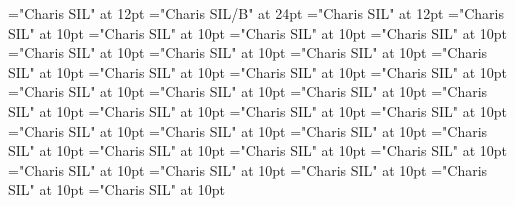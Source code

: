 \documentclass[a4paper]{article}
\begin{document}
\pagestyle{plain}
\sloppy
\setlength{\parfillskip}{0pt plus 1fil}
\font{}="Charis SIL" at 12pt
\font{}="Charis SIL/B" at 24pt
\font{}="Charis SIL" at 12pt
\font\entryletDatadicBody="Charis SIL" at 10pt
\font\pictureRightentryletDatadicBody="Charis SIL" at 10pt
\font\picturepictureRightentryletDatadicBody="Charis SIL" at 10pt
\font\pictureCaptionpictureRightentryletDatadicBody="Charis SIL" at 10pt
\font\CmPicturepublishStemPileThumbnailPubpictureCaptionpictureRightentryletDatadicBody="Charis SIL" at 10pt
\font\pictureLabelenpictureCaptionpictureRightentryletDatadicBody="Charis SIL" at 10pt
\font\spanenpictureLabelenpictureCaptionpictureRightentryletDatadicBody="Charis SIL" at 10pt
\font\headwordggoTeluxINentryletDatadicBody="Charis SIL" at 10pt
\font\pronunciationsentryletDatadicBody="Charis SIL" at 10pt
\font\pronunciationggofonipaxemicpronunciationsentryletDatadicBody="Charis SIL" at 10pt
\font\spanggofonipaxemicpronunciationggofonipaxemicpronunciationsentryletDatadicBody="Charis SIL" at 10pt
\font\sensesentryletDatadicBody="Charis SIL" at 10pt
\font\sensesensesentryletDatadicBody="Charis SIL" at 10pt
\font\grammaticalinfosensesensesentryletDatadicBody="Charis SIL" at 10pt
\font\partofspeechengrammaticalinfosensesensesentryletDatadicBody="Charis SIL" at 10pt
\font\spanenpartofspeechengrammaticalinfosensesensesentryletDatadicBody="Charis SIL" at 10pt
\font\xsensenumbersensesentryletDatadicBody="Charis SIL" at 10pt
\font{}="Charis SIL" at 10pt
\font\spanendefinitionensensesensesentryletDatadicBody="Charis SIL" at 10pt
\font\LexSensepublishStemGlossPubensensesensesentryletDatadicBody="Charis SIL" at 10pt
\font\spanenLexSensepublishStemGlossPubensensesensesentryletDatadicBody="Charis SIL" at 10pt
\font\examplessensesensesentryletDatadicBody="Charis SIL" at 10pt
\font\exampleggoTeluxINexamplessensesensesentryletDatadicBody="Charis SIL" at 10pt
\font\spanggoTeluxINexampleggoTeluxINexamplessensesensesentryletDatadicBody="Charis SIL" at 10pt
\font\translationsexamplessensesensesentryletDatadicBody="Charis SIL" at 10pt
\font\translationentranslationsexamplessensesensesentryletDatadicBody="Charis SIL" at 10pt
\font\xitementranslationentranslationsexamplessensesensesentryletDatadicBody="Charis SIL" at 10pt
\font\spanenxitementranslationentranslationsexamplessensesensesentryletDatadicBody="Charis SIL" at 10pt
\font\xitemtetranslationentranslationsexamplessensesensesentryletDatadicBody="Charis SIL" at 10pt
\font\spantexitemtetranslationentranslationsexamplessensesensesentryletDatadicBody="Charis SIL" at 10pt
\end{document}
